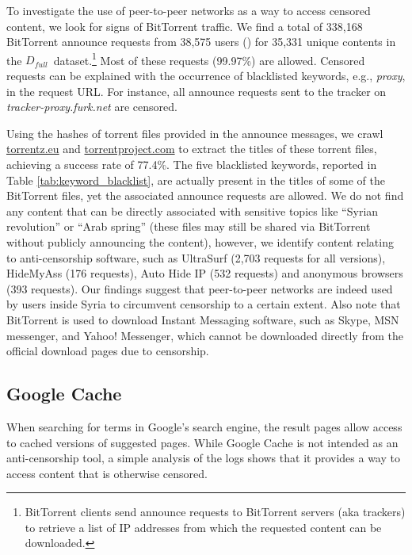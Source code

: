 \documentclass{sig-alternate-2013}
\newcommand{\red}[1] {{\color{black}{#1}}}
\def\df{$D_{full}$\xspace}
\begin{document}
To investigate the use of peer-to-peer networks as a way to access censored content, we look for signs of BitTorrent traffic. We find a total of 338,168 BitTorrent announce requests from 38,575 users (\red{BitTorrent uses a 20-byte peer\_id field to identify peers, which we use to count unique users}) for 35,331 unique contents in the \df\ dataset.\footnote{BitTorrent clients send announce requests to BitTorrent servers (aka trackers) to retrieve a list of IP addresses from which the requested content can be downloaded.} Most of these requests (99.97\%) are allowed. Censored requests can be explained with the occurrence of blacklisted keywords, e.g., {\em proxy}, in the request URL. For instance, all announce requests sent to the tracker on \emph{tracker-proxy.furk.net} are censored. 

Using the hashes of torrent files provided in the announce messages, we crawl  \url{torrentz.eu} and \url{torrentproject.com} to extract the titles of these torrent files, achieving a success rate of 77.4\%. 
The five blacklisted keywords, reported in Table \ref{tab:keyword_blacklist}, are actually present in the titles of some of the BitTorrent files, yet the associated announce requests are allowed. We do not find any content that can be directly associated with sensitive topics like ``Syrian revolution'' or ``Arab spring'' (these files may still be shared via BitTorrent without publicly announcing the content), however, we identify content relating to anti-censorship software, such as UltraSurf (2,703 requests for all versions), HideMyAss (176 requests), Auto Hide IP (532 requests) and anonymous browsers (393 requests). Our findings suggest that peer-to-peer networks are indeed used by users inside Syria to circumvent censorship to a certain extent. Also note that BitTorrent is used to download Instant Messaging software, such as Skype, MSN messenger, and Yahoo! Messenger, which cannot be downloaded directly from the official download pages due to censorship.

\subsection{Google Cache}

When searching for terms in Google's search engine, the result pages allow access to  cached versions of suggested pages.  While Google Cache is not intended as an anti-censorship tool, a simple analysis of the logs shows that it provides a way to access content that is otherwise censored. 
\end{document}
